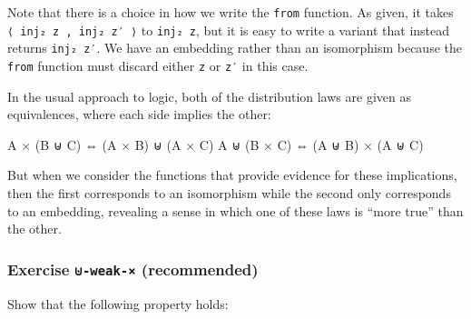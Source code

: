 Note that there is a choice in how we write the \texttt{from} function.
As given, it takes \texttt{⟨\ inj₂\ z\ ,\ inj₂\ z′\ ⟩} to
\texttt{inj₂\ z}, but it is easy to write a variant that instead returns
\texttt{inj₂\ z′}. We have an embedding rather than an isomorphism
because the \texttt{from} function must discard either \texttt{z} or
\texttt{z′} in this case.

In the usual approach to logic, both of the distribution laws are given
as equivalences, where each side implies the other:

\begin{myDisplay}
A × (B ⊎ C) ⇔ (A × B) ⊎ (A × C)
A ⊎ (B × C) ⇔ (A ⊎ B) × (A ⊎ C)
\end{myDisplay}

But when we consider the functions that provide evidence for these
implications, then the first corresponds to an isomorphism while the
second only corresponds to an embedding, revealing a sense in which one
of these laws is ``more true'' than the other.

\hypertarget{exercise--weak--recommended}{%
\subsubsection{\texorpdfstring{Exercise \texttt{⊎-weak-×}
(recommended)}{Exercise ⊎-weak-× (recommended)}}\label{exercise--weak--recommended}}

Show that the following property holds:

\begin{fence}
\begin{code}%
\>[0]\<%
\\
\>[0][@{}l@{\AgdaIndent{0}}]%
\>[2]\AgdaSpace{}%
\AgdaSymbol{:}\AgdaSpace{}%
\AgdaSpace{}%
\AgdaSymbol{\{}\AgdaSpace{}%
\AgdaSpace{}%
\AgdaSpace{}%
\AgdaSymbol{:}\AgdaSpace{}%
\AgdaSymbol{\}}\AgdaSpace{}%
\AgdaSpace{}%
\AgdaSymbol{(}\AgdaSpace{}%
\AgdaSpace{}%
\AgdaSymbol{)}\AgdaSpace{}%
\AgdaSpace{}%
\AgdaSpace{}%
\AgdaSpace{}%
\AgdaSpace{}%
\AgdaSpace{}%
\AgdaSymbol{(}\AgdaSpace{}%
\AgdaSpace{}%
\AgdaSymbol{)}\<%
\end{code}
\end{fence}

